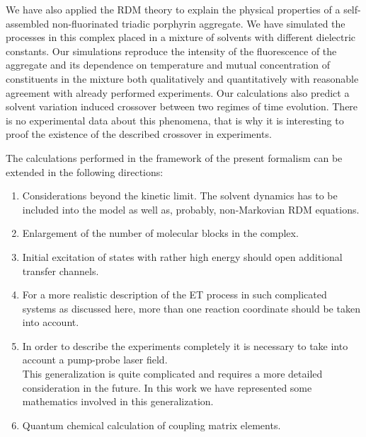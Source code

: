 \documentclass[12pt,twoside,a4paper]{report}
\begin{document}
{We have also applied
the RDM theory to
 explain the physical properties of 
a self-assembled non-fluorinated triadic porphyrin aggregate.
We have simulated the processes in this complex
placed in a mixture of solvents with different 
dielectric constants.
Our simulations reproduce the intensity of the fluorescence
of the aggregate and its dependence on temperature and 
mutual concentration of constituents in the mixture
 both 
qualitatively and quantitatively with
reasonable 
agreement with already performed experiments. 
Our calculations also predict 
a solvent variation induced crossover 
between two regimes of time evolution. 
There is no experimental data about this phenomena, 
that is why it is interesting to proof the existence of the 
described crossover in experiments. 




The calculations performed in the framework of the present formalism
can be extended in the following directions:
\begin{enumerate}
\item
      Considerations beyond the kinetic limit.
      The solvent dynamics has to be included into the model 
      as well as, probably, 
      non-Markovian RDM equations.\\
\item
      Enlargement of the number of molecular blocks in the complex.\\
\item
      Initial excitation of states with  rather high energy
      should open additional transfer channels.\\
\item
      For a more realistic
      description of the ET process in such complicated systems as
      discussed here, more than one reaction coordinate should be taken into
      account.\\ 
\item
      In order to  describe the experiments completely it is 
      necessary to take into account a pump-probe laser field.\\  
      This generalization 
      is quite complicated and requires a more detailed consideration in the future. 
      In this work
      we have represented some mathematics involved in this generalization.\\ 
\item
      Quantum chemical calculation of coupling matrix elements.
\end{enumerate}


}
\end{document}
